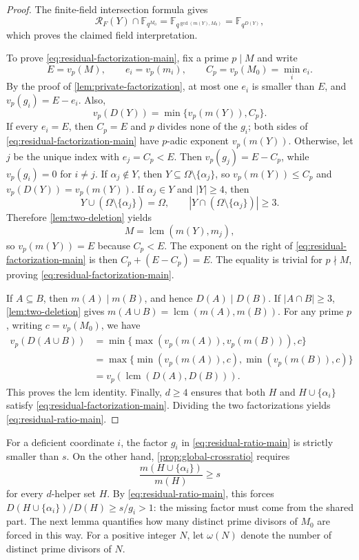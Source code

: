 \documentclass[11pt,onecolumn]{IEEEtran}
\newcommand{\lcmop}{\operatorname{lcm}}
\newcommand{\crf}{\mathscr R}
\begin{document}
\begin{proof}
The finite-field intersection formula gives
\[
\crf_F(Y)\cap\mathbb F_{q^{M_0}}
=\mathbb F_{q^{\gcd(m(Y),M_0)}}
=\mathbb F_{q^{D(Y)}},
\]
which proves the claimed field interpretation.

To prove \eqref{eq:residual-factorization-main}, fix a prime
$p\mid M$ and write
\[
E=v_p(M),\qquad e_i=v_p(m_i),\qquad
C_p=v_p(M_0)=\min_i e_i.
\]
By the proof of \cref{lem:private-factorization}, at most one $e_i$
is smaller than $E$, and $v_p(g_i)=E-e_i$.  Also,
\[
v_p(D(Y))=\min\{v_p(m(Y)),C_p\}.
\]
If every $e_i=E$, then $C_p=E$ and $p$ divides none of the $g_i$;
both sides of \eqref{eq:residual-factorization-main} have
$p$-adic exponent $v_p(m(Y))$.
Otherwise, let $j$ be the unique index with $e_j=C_p<E$.
Then $v_p(g_j)=E-C_p$, while $v_p(g_i)=0$ for $i\ne j$.
If $\alpha_j\notin Y$, then
$Y\subseteq\Omega\setminus\{\alpha_j\}$, so
$v_p(m(Y))\le C_p$ and $v_p(D(Y))=v_p(m(Y))$.
If $\alpha_j\in Y$ and $|Y|\ge4$, then
\[
Y\cup(\Omega\setminus\{\alpha_j\})=\Omega,
\qquad
|Y\cap(\Omega\setminus\{\alpha_j\})|\ge3.
\]
Therefore \cref{lem:two-deletion} yields
\[
M=\lcmop(m(Y),m_j),
\]
so $v_p(m(Y))=E$ because $C_p<E$.  The exponent on the right of
\eqref{eq:residual-factorization-main} is then
$C_p+(E-C_p)=E$.  The equality is trivial for $p\nmid M$,
proving \eqref{eq:residual-factorization-main}.

If $A\subseteq B$, then $m(A)\mid m(B)$, and hence
$D(A)\mid D(B)$.  If
$|A\cap B|\ge3$, \cref{lem:two-deletion} gives
$m(A\cup B)=\lcmop(m(A),m(B))$.  For any prime $p$,
writing $c=v_p(M_0)$, we have
\begin{align*}
v_p(D(A\cup B))
&=\min\{\max(v_p(m(A)),v_p(m(B))),c\}\\
&=\max\{\min(v_p(m(A)),c),\min(v_p(m(B)),c)\}\\
&=v_p(\lcmop(D(A),D(B))).
\end{align*}
This proves the lcm identity.  Finally, $d\ge4$ ensures that both
$H$ and $H\cup\{\alpha_i\}$ satisfy
\eqref{eq:residual-factorization-main}.  Dividing the two
factorizations yields \eqref{eq:residual-ratio-main}.
\end{proof}

For a deficient coordinate $i$, the factor $g_i$ in
\eqref{eq:residual-ratio-main} is strictly smaller than $s$.  On the
other hand, \cref{prop:global-crossratio} requires
\[
\frac{m(H\cup\{\alpha_i\})}{m(H)}\ge s
\]
for every $d$-helper set $H$.  By \eqref{eq:residual-ratio-main},
this forces
$D(H\cup\{\alpha_i\})/D(H)\ge s/g_i>1$:
the missing factor must come from the shared part.  The next lemma
quantifies how many distinct prime divisors of $M_0$ are forced
in this way.  For a positive integer $N$, let $\omega(N)$ denote the
number of distinct prime divisors of $N$.
\end{document}
